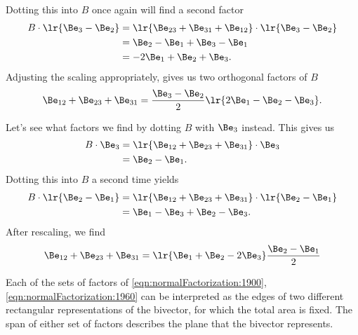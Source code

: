 {\begin{equation}
\end{equation}
Dotting this into \( B \) once again will find a second factor
\begin{equation}\label{eqn:normalFactorization:1880}
\begin{aligned}
B \cdot \lr{ \Be_{3} - \Be_{2} }
&= \lr{  \Be_{23} + \Be_{31} + \Be_{12} } \cdot \lr{ \Be_{3} - \Be_{2} } \\
&=
\Be_2 - \Be_1 + \Be_3 - \Be_1 \\
&=
-2 \Be_1 + \Be_2 + \Be_3.
\end{aligned}
\end{equation}
Adjusting the scaling appropriately, gives us two orthogonal factors of \( B \)
\begin{equation}\label{eqn:normalFactorization:1900}
\Be_{12} + \Be_{23} + \Be_{31} = \frac{ \Be_3 - \Be_2 }{2} \lr{ 2 \Be_1 - \Be_2 - \Be_3 }.
\end{equation}

Let's see what factors we find by dotting \( B \) with \( \Be_3 \) instead.  This gives us
\begin{equation}\label{eqn:normalFactorization:1920}
\begin{aligned}
B \cdot \Be_3
&=
\lr{ \Be_{12} + \Be_{23} + \Be_{31} } \cdot \Be_3 \\
&=
\Be_2 - \Be_1.
\end{aligned}
\end{equation}
Dotting this into \( B \) a second time yields
\begin{equation}\label{eqn:normalFactorization:1940}
\begin{aligned}
B \cdot \lr{  \Be_2 - \Be_1 }
&=
\lr{ \Be_{12} + \Be_{23} + \Be_{31} } \cdot \lr{  \Be_2 - \Be_1 } \\
&=
\Be_1 - \Be_3 + \Be_2 - \Be_3.
\end{aligned}
\end{equation}
After rescaling, we find
\begin{equation}\label{eqn:normalFactorization:1960}
\Be_{12} + \Be_{23} + \Be_{31} = \lr{ \Be_1 + \Be_2 - 2 \Be_3 } \frac{ \Be_2 - \Be_1 }{2}
\end{equation}

Each of the sets of factors of \cref{eqn:normalFactorization:1900}, \cref{eqn:normalFactorization:1960} can be interpreted as the edges of two different rectangular representations of the bivector, for which the total area is fixed.  The span of either set of factors describes the plane that the bivector represents.
%
} %
